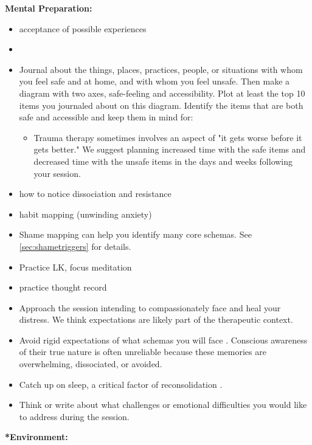 \documentclass[12pt,letterpaper]{article}
\begin{document}
\noindent \textbf{Mental Preparation:}
\begin{itemize}
    \item acceptance of possible experiences
    \item {}
    \label{safetymapping}
    \item Journal about the things, places, practices, people, or situations with whom you feel safe and at home, and with whom you feel unsafe. Then make a diagram with two axes, safe-feeling and accessibility. Plot at least the top 10 items you journaled about on this diagram. Identify the items that are both safe and accessible and keep them in mind for:
    \begin{itemize}
        \item Trauma therapy sometimes involves an aspect of "it gets worse before it gets better." We suggest planning increased time with the safe items and decreased time with the unsafe items in the days and weeks following your session.
    \end{itemize}
    \item how to notice dissociation and resistance
    \item habit mapping (unwinding anxiety)
    \item Shame mapping can help you identify many core schemas. See \ref{sec:shametriggers} for details.
    \item Practice LK, focus meditation 
    \item practice thought record
    \item Approach the session intending to compassionately face and heal your distress. We think expectations are likely part of the therapeutic context.
    \item Avoid rigid expectations of what schemas you will face \cite{mithoeferManual}. Conscious awareness of their true nature is often unreliable because these memories are overwhelming, dissociated, or avoided.
    \item Catch up on sleep, a critical factor of reconsolidation \cite{walkerSleep}.
    \item Think or write about what challenges or emotional difficulties you would like to address during the session.
\end{itemize}
\noindent \textbf{*Environment:}
\end{document}
